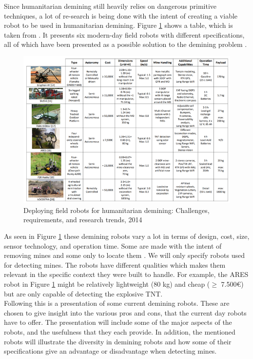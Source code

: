 Since humanitarian demining still heavily relies on dangerous primitive techniques, a lot of re-search is being done with the intent of creating a viable robot to be used in humanitarian demining. Figure \ref{fig:field_robots_for_humanitarian_demining_2014} shows a table, which is taken from \cite{FieldRobots2014}. It presents six modern-day field robots with different specifications, all of which have been presented as a possible solution to the demining problem \cite{FieldRobots2014}.
\begin{figure}[h]
  \centering
      \includegraphics[width=1\textwidth]{00 - Images/field_robots_for_humanitarian_demining_2014.png}
  \caption{Deploying field robots for humanitarian demining: Challenges, requirements, and research trends, 2014 \cite{FieldRobots2014}}
  \label{fig:field_robots_for_humanitarian_demining_2014}
\end{figure}

As seen in Figure \ref{fig:field_robots_for_humanitarian_demining_2014} these demining robots vary a lot in terms of design, cost, size, sensor technology, and operation time. Some are made with the intent of removing mines and some only to locate them \cite{FieldRobots2014}. We will only specify robots used for detecting mines. The robots have different qualities which makes them relevant in the specific context they were built to handle. For example, the ARES robot in Figure \ref{fig:field_robots_for_humanitarian_demining_2014} might be relatively lightweight (80 kg) and cheap ($\ge$ 7.500€) but are only capable of detecting the explosive TNT.\\

Following this is a presentation of some current demining robots. These are chosen to give insight into the various pros and cons, that the current day robots have to offer. The presentation will include some of the major aspects of the robots, and the usefulness that they each provide. In addition, the mentioned robots will illustrate the diversity in demining robots and how some of their specifications give an advantage or disadvantage when detecting mines.

